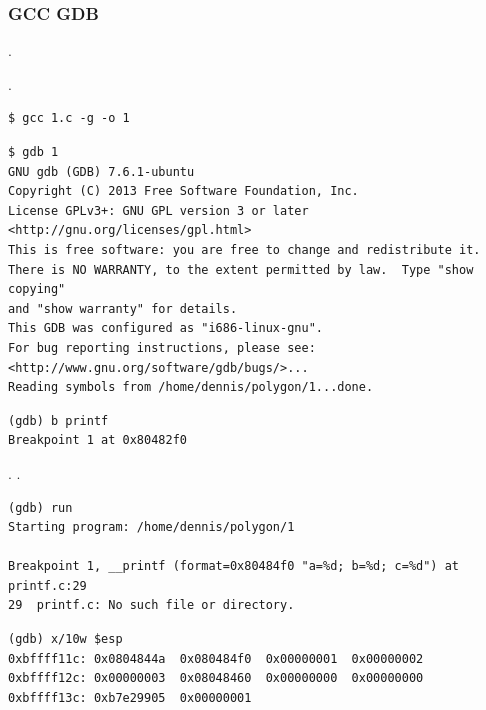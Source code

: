 \ifdefined\IncludeGDB
\subsubsection{GCC \AndENRU GDB}

.

 .

\begin{lstlisting}
$ gcc 1.c -g -o 1
\end{lstlisting}

\begin{lstlisting}
$ gdb 1
GNU gdb (GDB) 7.6.1-ubuntu
Copyright (C) 2013 Free Software Foundation, Inc.
License GPLv3+: GNU GPL version 3 or later <http://gnu.org/licenses/gpl.html>
This is free software: you are free to change and redistribute it.
There is NO WARRANTY, to the extent permitted by law.  Type "show copying"
and "show warranty" for details.
This GDB was configured as "i686-linux-gnu".
For bug reporting instructions, please see:
<http://www.gnu.org/software/gdb/bugs/>...
Reading symbols from /home/dennis/polygon/1...done.
\end{lstlisting}

\begin{lstlisting}[caption=\RU{установим брякпойнт на}\EN{let's set breakpoint on} \printf]
(gdb) b printf
Breakpoint 1 at 0x80482f0
\end{lstlisting}

.
 \printf 
{}.

\begin{lstlisting}
(gdb) run
Starting program: /home/dennis/polygon/1 

Breakpoint 1, __printf (format=0x80484f0 "a=%d; b=%d; c=%d") at printf.c:29
29	printf.c: No such file or directory.
\end{lstlisting}


\begin{lstlisting}
(gdb) x/10w $esp
0xbffff11c:	0x0804844a	0x080484f0	0x00000001	0x00000002
0xbffff12c:	0x00000003	0x08048460	0x00000000	0x00000000
0xbffff13c:	0xb7e29905	0x00000001
\end{lstlisting}

